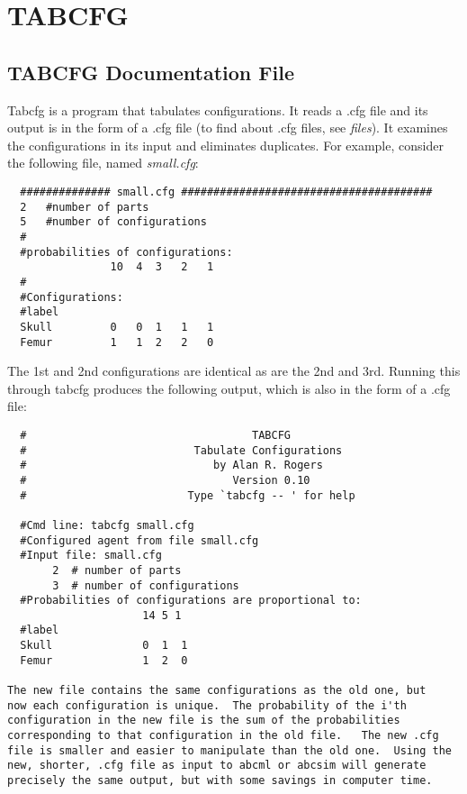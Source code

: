 
\section{TABCFG}%

\subsection*{TABCFG Documentation File}%

Tabcfg is a program that tabulates configurations.  It reads a .cfg
file and its output is in the form of a .cfg file (to find about .cfg
files, see {\em files\/}).  It examines the configurations in its input
and eliminates duplicates.  For example, consider the following 
file, named {\em small.cfg\/}:
\begin{verbatim}
  ############## small.cfg #######################################
  2   #number of parts
  5   #number of configurations
  #
  #probabilities of configurations:
                10  4  3   2   1
  #
  #Configurations:
  #label                
  Skull         0   0  1   1   1
  Femur         1   1  2   2   0
\end{verbatim}

The 1st and 2nd configurations are identical as are the 2nd and 3rd.
Running this through tabcfg produces the following output, which is
also in the form of a .cfg file:
\begin{verbatim}
  #                                   TABCFG
  #                          Tabulate Configurations
  #                             by Alan R. Rogers
  #                                Version 0.10
  #                         Type `tabcfg -- ' for help
  
  #Cmd line: tabcfg small.cfg
  #Configured agent from file small.cfg
  #Input file: small.cfg
       2  # number of parts
       3  # number of configurations
  #Probabilities of configurations are proportional to:
                     14 5 1
  #label
  Skull              0  1  1
  Femur              1  2  0
  
The new file contains the same configurations as the old one, but
now each configuration is unique.  The probability of the i'th
configuration in the new file is the sum of the probabilities
corresponding to that configuration in the old file.   The new .cfg
file is smaller and easier to manipulate than the old one.  Using the
new, shorter, .cfg file as input to abcml or abcsim will generate
precisely the same output, but with some savings in computer time.
\end{verbatim}

